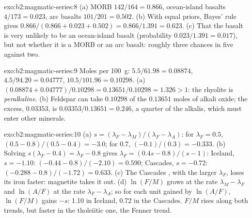 \begin{solution}{exo:b2:magmatic-series:8}
(a) MORB $142/164 = 0.866$, ocean-island basalts $4/173 = 0.023$, arc basalts $101/201 =
0.502$. (b) With equal priors, Bayes' rule gives $0.866/(0.866 + 0.023 + 0.502) =
0.866/1.391 = 0.623$. (c) That the basalt is very unlikely to be an ocean-island basalt
(probability $0.023/1.391 = 0.017$), but not whether it is a MORB or an arc basalt:
roughly three chances in five against two.
\end{solution}

\begin{solution}{exo:b2:magmatic-series:9}
Moles per \qty{100}{g}:  $5.5/61.98 = 0.08874$,  $4.5/94.20 =
0.04777$,  $10.5/101.96 = 0.10298$. (a) $(0.08874 + 0.04777)/0.10298 =
0.13651/0.10298 = 1.326 > 1$: the rhyolite is \emph{peralkaline}. (b) Feldspar can
take $0.10298$ of the $0.13651$ moles of alkali oxide; the excess, $0.03353$, is
$0.03353/0.13651 = 0.246$, a quarter of the alkalis, which must enter other minerals.
\end{solution}

\begin{solution}{exo:b2:magmatic-series:10}
(a) $s = (\lambda_F - \lambda_M)/(\lambda_F - \lambda_A)$: for $\lambda_F = 0.5$, $(0.5
- 0.8)/(0.5 - 0.4) = -3.0$; for $0.7$, $(-0.1)/(0.3) = -0.333$. (b) Solving
$s(\lambda_F - 0.4) = \lambda_F - 0.8$ gives $\lambda_F = (0.4s - 0.8)/(s - 1)$:
Iceland, $s = -1.10$: $(-0.44 - 0.8)/(-2.10) = 0.590$; Cascades, $s = -0.72$:
$(-0.288 - 0.8)/(-1.72) = 0.633$. (c) The Cascades , with the larger
$\lambda_F$, loses its iron faster: magnetite takes it out. (d) $\ln(F/M)$ grows at the
rate $\lambda_M - \lambda_F$ and $\ln(A/F)$ at the rate $\lambda_F - \lambda_A$; so for
each unit gained by $\ln(A/F)$, $\ln(F/M)$ gains $-s$: 1.10 in Iceland, 0.72 in the
Cascades. $F/M$ rises along both trends, but faster in the tholeiitic one, the Fenner
trend.
\end{solution}

